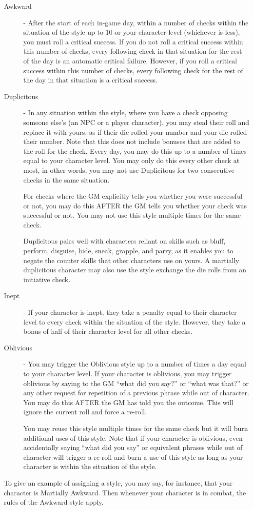 \begin{description}
\item[Awkward] - After the start of each in-game day, within a number of checks within the situation of the style up to 10 or your character level (whichever is less), you must roll a critical success. If you do not roll a critical success within this number of checks, every following check in that situation for the rest of the day is an automatic critical failure. However, if you roll a critical success within this number of checks, every following check for the rest of the day in that situation is a critical success.

\item[Duplicitous] - In any situation within the style, where you have a check opposing someone else’s (an NPC or a player character), you may steal their roll and replace it with yours, as if their die rolled your number and your die rolled their number. Note that this does not include bonuses that are added to the roll for the check. Every day, you may do this up to a number of times equal to your character level. You may only do this every other check at most, in other words, you may not use Duplicitous for two consecutive checks in the same situation.

For checks where the GM explicitly tells you whether you were successful or not, you may do this AFTER the GM tells you whether your check was successful or not. You may not use this style multiple times for the same check.

Duplicitous pairs well with characters reliant on skills such as bluff, perform, disguise, hide, sneak, grapple, and parry, as it enables you to negate the counter skills that other characters use on yours. A martially duplicitous character may also use the style exchange the die rolls from an initiative check.

\item[Inept] - If your character is inept, they take a penalty equal to their character level to every check within the situation of the style. However, they take a bonus of half of their character level for all other checks.

\item[Oblivious] - You may trigger the Oblivious style up to a number of times a day equal to your character level. If your character is oblivious, you may trigger oblivious by saying to the GM “what did you say?” or “what was that?” or any other request for repetition of a previous phrase while out of character. You may do this AFTER the GM has told you the outcome. This will ignore the current roll and force a re-roll.

You may reuse this style multiple times for the same check but it will burn additional uses of this style. Note that if your character is oblivious, even accidentally saying “what did you say” or equivalent phrases while out of character will trigger a re-roll and burn a use of this style as long as your character is within the situation of the style.
\end{description}

To give an example of assigning a style, you may say, for instance, that your character is Martially Awkward. Then whenever your character is in combat, the rules of the Awkward style apply.